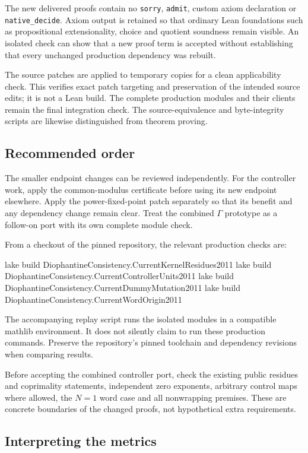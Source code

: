 \documentclass[11pt,letterpaper]{article}
\newcommand{\code}[1]{\nolinkurl{#1}}
\begin{document}
The new delivered proofs contain no \code{sorry}, \code{admit}, custom axiom declaration or \code{native_decide}. Axiom output is retained so that ordinary Lean foundations such as propositional extensionality, choice and quotient soundness remain visible. An isolated check can show that a new proof term is accepted without establishing that every unchanged production dependency was rebuilt.

The source patches are applied to temporary copies for a clean applicability check. This verifies exact patch targeting and preservation of the intended source edits; it is not a Lean build. The complete production modules and their clients remain the final integration check. The source-equivalence and byte-integrity scripts are likewise distinguished from theorem proving.

\subsection{Recommended order}

The smaller endpoint changes can be reviewed independently. For the controller work, apply the common-modulus certificate before using its new endpoint elsewhere. Apply the power-fixed-point patch separately so that its benefit and any dependency change remain clear. Treat the combined \(\Gamma\) prototype as a follow-on port with its own complete module check.

From a checkout of the pinned repository, the relevant production checks are:
\begin{Lean}
lake build DiophantineConsistency.CurrentKernelResidues2011
lake build DiophantineConsistency.CurrentControllerUnits2011
lake build DiophantineConsistency.CurrentDummyMutation2011
lake build DiophantineConsistency.CurrentWordOrigin2011
\end{Lean}
The accompanying replay script runs the isolated modules in a compatible mathlib environment. It does not silently claim to run these production commands. Preserve the repository's pinned toolchain and dependency revisions when comparing results.

Before accepting the combined controller port, check the existing public residues and coprimality statements, independent zero exponents, arbitrary control maps where allowed, the \(N=1\) word case and all nonwrapping premises. These are concrete boundaries of the changed proofs, not hypothetical extra requirements.

\subsection{Interpreting the metrics}
\end{document}
